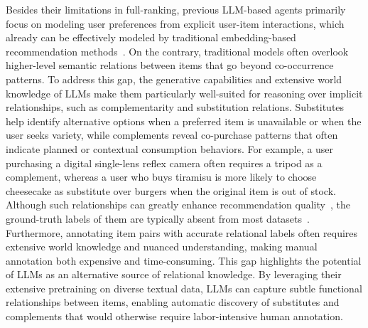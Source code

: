 Besides their limitations in full-ranking, previous LLM-based agents primarily focus on modeling user preferences from explicit user-item interactions, which already can be effectively modeled by traditional embedding-based recommendation methods~\cite{simplex, enmf, LightGCN}. On the contrary, traditional models often overlook higher-level semantic relations between items that go beyond co-occurrence patterns. 
To address this gap, the generative capabilities and extensive world knowledge of LLMs make them particularly well-suited for reasoning over implicit relationships, such as complementarity and substitution relations.
Substitutes help identify alternative options when a preferred item is unavailable or when the user seeks variety, while complements reveal co-purchase patterns that often indicate planned or contextual consumption behaviors. 
For example, a user purchasing a digital single-lens reflex camera often requires a tripod as a complement, whereas a user who buys tiramisu is more likely to choose cheesecake as substitute over burgers when the original item is out of stock.
Although such relationships can greatly enhance recommendation quality~\cite{subcom22, subcom23, Nerrise25-substitution}, the ground-truth labels of them are typically absent from most datasets~\cite{dataset:amazon, xmarket}. Furthermore, annotating item pairs with accurate relational labels often requires extensive world knowledge and nuanced understanding, making manual annotation both expensive and time-consuming. This gap highlights the potential of LLMs as an alternative source of relational knowledge. By leveraging their extensive pretraining on diverse textual data, LLMs can capture subtle functional relationships between items, enabling automatic discovery of substitutes and complements that would otherwise require labor-intensive human annotation.

